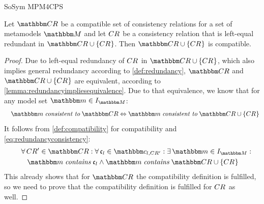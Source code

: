 \begin{copiedFrom}{SoSym MPM4CPS}
\begin{theorem} \label{theorem:redundancycompatibility}
    Let $\consistencyrelationset{CR}$ be a compatible set of consistency relations for a set of metamodels $\metamodelset{M}$ and let $CR_{}$ be a consistency relation that is left-equal redundant in $\consistencyrelationset{CR} \cup \setted{\consistencyrelation{CR}{}}$. Then $\consistencyrelationset{CR} \cup \setted{\consistencyrelation{CR}{}}$ is compatible. 
\end{theorem}

\begin{proof}
    Due to left-equal redundancy of $CR_{}$ in $\consistencyrelationset{CR} \cup \setted{\consistencyrelation{CR}{}}$, which also implies general redundancy according to \autoref{def:redundancy}, $\consistencyrelationset{CR}$ and $\consistencyrelationset{CR} \cup \setted{\consistencyrelation{CR}{}}$ are equivalent, according to \autoref{lemma:redundancyimpliesequivalence}.
    Due to that equivalence, we know that for any model set $\modelset{m} \in \metamodelinstances{\metamodelset{M}}$:
    \begin{equation} \label{eq:redundancyconsistency}
        \formulaskip 
        \modelset{m} \mathtext{consistent to} \consistencyrelationset{CR} \equivalent     \modelset{m} \mathtext{consistent to} \consistencyrelationset{CR} \cup \setted{\consistencyrelation{CR}{}}
    \end{equation}
    It follows from \autoref{def:compatibility} for compatibility and \autoref{eq:redundancyconsistency}:
    \begin{align} \label{eq:redundancycompatibleexisting}
        \formulaskip & \nonumber
        \forall \consistencyrelation{CR'}{} \in \consistencyrelationset{CR} : \forall \conditionelement{c}{l} \in \condition{c}{l, \consistencyrelation{CR'}{}} %
        : \exists \modelset{m} \in \metamodelinstances{\metamodelset{M}} : \\
        & \formulaskip
        \modelset{m} \containsmath \conditionelement{c}{l} \land \modelset{m} \containsmath \consistencyrelationset{CR} \cup \setted{\consistencyrelation{CR}{}}
    \end{align}
    This already shows that for $\consistencyrelationset{CR}$ the compatibility definition is fulfilled, so we need to prove that the compatibility definition is fulfilled for $CR_{}$ as well.

\end{proof}
\end{copiedFrom}
